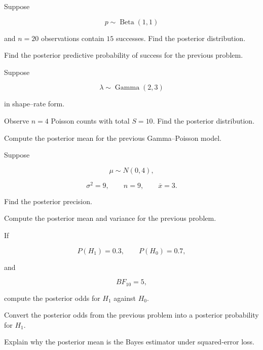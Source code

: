 \begin{exercise}[2]
Suppose

\[
p
\sim
\operatorname{Beta}(1,1)
\]

and \(n=20\) observations contain \(15\) successes. Find the posterior
distribution.
\end{exercise}

\begin{exercise}[2]
Find the posterior predictive probability of success for the previous
problem.
\end{exercise}

\begin{exercise}[2]
Suppose

\[
\lambda
\sim
\operatorname{Gamma}(2,3)
\]

in shape--rate form.

Observe \(n=4\) Poisson counts with total \(S=10\). Find the posterior
distribution.
\end{exercise}

\begin{exercise}[2]
Compute the posterior mean for the previous Gamma--Poisson model.
\end{exercise}

\begin{exercise}[2]
Suppose

\[
\mu
\sim
N(0,4),
\]

\[
\sigma^2=9,
\qquad
n=9,
\qquad
\overline{x}=3.
\]

Find the posterior precision.
\end{exercise}

\begin{exercise}[2]
Compute the posterior mean and variance for the previous problem.
\end{exercise}

\begin{exercise}[2]
If

\[
P(H_1)=0.3,
\qquad
P(H_0)=0.7,
\]

and

\[
BF_{10}=5,
\]

compute the posterior odds for \(H_1\) against \(H_0\).
\end{exercise}

\begin{exercise}[2]
Convert the posterior odds from the previous problem into a posterior
probability for \(H_1\).
\end{exercise}

\begin{exercise}[2]
Explain why the posterior mean is the Bayes estimator under squared-error
loss.
\end{exercise}

